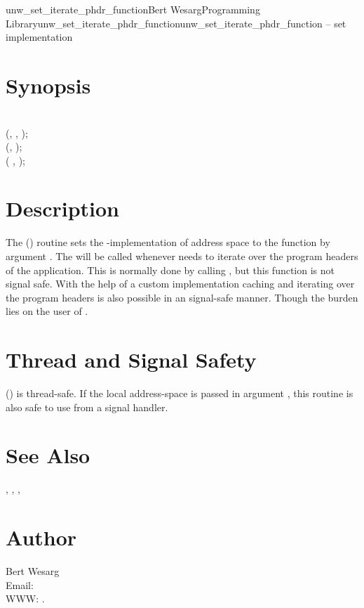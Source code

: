 \documentclass{article}
\begin{document}
\begin{Name}{3}{unw\_set\_iterate\_phdr\_function}{Bert Wesarg}{Programming Library}{unw\_set\_iterate\_phdr\_function}unw\_set\_iterate\_phdr\_function -- set  implementation
\end{Name}

\section{Synopsis}


\\

 (, , );\\
 (, );\\

 ( ,  );\\

\section{Description}

The () routine sets the -implementation of address space  to the function by argument .
The  will be called whenever  needs to iterate over the program headers of the application.
This is normally done by calling , but this function is not signal safe.
With the help of a custom implementation caching and iterating over the program headers is also possible in an signal-safe manner.
Though the burden lies on the user of .

\section{Thread and Signal Safety}

() is thread-safe.  If the local address-space
is passed in argument , this routine is also safe to use from
a signal handler.


\section{See Also}

,
,
,

\section{Author}

\noindent
Bert Wesarg\\
Email: \\
WWW: .
\LatexManEnd
\end{document}
